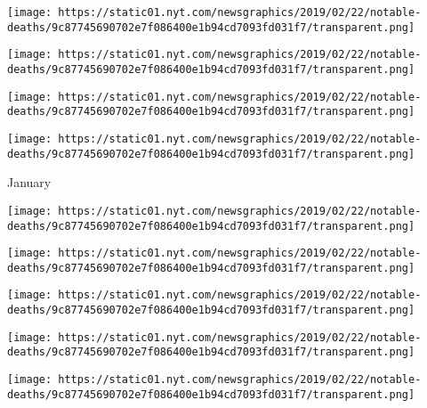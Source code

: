 \texttt{[image: https://static01.nyt.com/newsgraphics/2019/02/22/notable-deaths/9c87745690702e7f086400e1b94cd7093fd031f7/transparent.png]}

\href{https://www.nytimes.com/2019/02/04/obituaries/julie-adams-dead.html}{}

\texttt{[image: https://static01.nyt.com/newsgraphics/2019/02/22/notable-deaths/9c87745690702e7f086400e1b94cd7093fd031f7/transparent.png]}

\href{https://www.nytimes.com/2019/02/04/obituaries/bob-friend-dead.html}{}

\texttt{[image: https://static01.nyt.com/newsgraphics/2019/02/22/notable-deaths/9c87745690702e7f086400e1b94cd7093fd031f7/transparent.png]}

\href{https://www.nytimes.com/2019/02/01/obituaries/rosemary-mariner-dead.html}{}

\texttt{[image: https://static01.nyt.com/newsgraphics/2019/02/22/notable-deaths/9c87745690702e7f086400e1b94cd7093fd031f7/transparent.png]}

January

\href{https://www.nytimes.com/2019/01/30/obituaries/morton-sobell-dead.html}{}

\texttt{[image: https://static01.nyt.com/newsgraphics/2019/02/22/notable-deaths/9c87745690702e7f086400e1b94cd7093fd031f7/transparent.png]}

\href{https://www.nytimes.com/2019/01/29/obituaries/kim-bok-dong-dead.html}{}

\texttt{[image: https://static01.nyt.com/newsgraphics/2019/02/22/notable-deaths/9c87745690702e7f086400e1b94cd7093fd031f7/transparent.png]}

\href{https://www.nytimes.com/2019/01/29/obituaries/oliver-mtukudzi-dead.html}{}

\texttt{[image: https://static01.nyt.com/newsgraphics/2019/02/22/notable-deaths/9c87745690702e7f086400e1b94cd7093fd031f7/transparent.png]}

\href{https://www.nytimes.com/2019/01/28/obituaries/stanley-hill-dead.html}{}

\texttt{[image: https://static01.nyt.com/newsgraphics/2019/02/22/notable-deaths/9c87745690702e7f086400e1b94cd7093fd031f7/transparent.png]}

\href{https://www.nytimes.com/2019/01/26/obituaries/michel-legrand-dead.html}{}

\texttt{[image: https://static01.nyt.com/newsgraphics/2019/02/22/notable-deaths/9c87745690702e7f086400e1b94cd7093fd031f7/transparent.png]}

